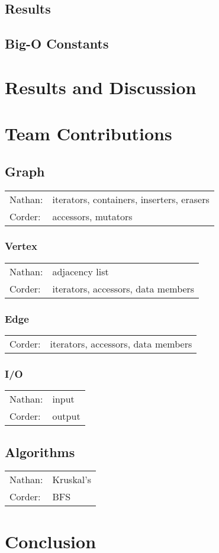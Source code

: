 \documentclass[titlepage]{article}
\begin{document}
\begin{multicols*}{2}
            \subsection{Results}
            \subsection{Big-O Constants}
        \section{Results and Discussion}
        \section{Team Contributions}
            \subsection{Graph}
                \begin{tabular}{l l}
                    Nathan: & iterators, containers, inserters, erasers \\
                    Corder: & accessors, mutators
                \end{tabular}
            \subsubsection{Vertex}
                \begin{tabular}{l l}
                    Nathan: & adjacency list \\
                    Corder: & iterators, accessors, data members
                \end{tabular}
            \subsubsection{Edge}
                \begin{tabular}{l l}
                Corder: & iterators, accessors, data members
                \end{tabular}
            \subsubsection{I/O}
                \begin{tabular}{l l}
                   Nathan: & input \\
                   Corder: & output
                \end{tabular}
            \subsection{Algorithms}
                \begin{tabular}{l l}
                    Nathan: & Kruskal's \\
                    Corder: & BFS
                \end{tabular}
        \section{Conclusion}
    \end{multicols*}
\end{document}
